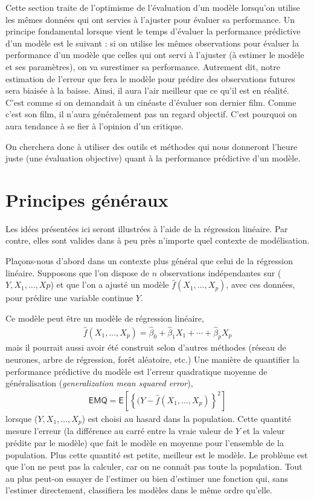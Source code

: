 \documentclass[
  11pt,
  letterpaper,
]{book}
\theoremstyle{definition}
\theoremstyle{definition}
\theoremstyle{definition}
\theoremstyle{remark}
\begin{document}
Cette section traite de l'optimisme de l'évaluation d'un modèle lorsqu'on utilise les mêmes données qui ont servies à l'ajuster pour évaluer sa performance. Un principe fondamental lorsque vient le temps d'évaluer la performance prédictive d'un modèle est le suivant : si on utilise les mêmes observations pour évaluer la performance d'un modèle que celles qui ont servi à l'ajuster (à estimer le modèle et ses paramètres), on va surestimer sa performance. Autrement dit, notre estimation de l'erreur que fera le modèle pour prédire des observations futures sera biaisée à la baisse. Ainsi, il aura l'air meilleur que ce qu'il est en réalité. C'est comme si on demandait à un cinéaste d'évaluer son dernier film. Comme c'est son film, il n'aura généralement pas un regard objectif. C'est pourquoi on aura tendance à se fier à l'opinion d'un critique.

On cherchera donc à utiliser des outils et méthodes qui nous donneront l'heure juste (une évaluation objective) quant à la performance prédictive d'un modèle.

\hypertarget{principes-guxe9nuxe9raux}{%
\section{Principes généraux}\label{principes-guxe9nuxe9raux}}

Les idées présentées ici seront illustrées à l'aide de la régression linéaire. Par contre, elles sont valides dans à peu près n'importe quel contexte de modélisation.

Plaçons-nous d'abord dans un contexte plus général que celui de la régression linéaire. Supposons que l'on dispose de \(n\) observations indépendantes sur (\(Y, X_1, \ldots, Xp\)) et que l'on a ajusté un modèle \(\widehat{f}(X_1, \ldots, X_p)\), avec ces données, pour prédire une variable continue \(Y\).

Ce modèle peut être un modèle de régression linéaire,
\begin{align*}
\widehat{f}(X_1, \ldots, X_p) = \widehat{\beta}_0 + \widehat{\beta}_1X_1 + \cdots + \widehat{\beta}_pX_p
\end{align*}
mais il pourrait aussi avoir été construit selon d'autres méthodes (réseau de neurones, arbre de régression, forêt aléatoire, etc.) Une manière de quantifier la performance prédictive du modèle est l'erreur quadratique moyenne de généralisation (\emph{generalization mean squared error}),
\begin{align*}
\mathsf{EMQ}=\mathsf{E}\left[\left\{(Y-\widehat{f}(X_1, \ldots, X_p)\right\}^2\right]
\end{align*}
lorsque (\(Y, X_1, \ldots, X_p\)) est choisi au hasard dans la population. Cette quantité mesure l'erreur (la différence au carré entre la vraie valeur de \(Y\) et la valeur prédite par le modèle) que fait le modèle en moyenne pour l'ensemble de la population. Plus cette quantité est petite, meilleur est le modèle. Le problème est que l'on ne peut pas la calculer, car on ne connaît pas toute la population. Tout au plus peut-on essayer de l'estimer ou bien d'estimer une fonction qui, sans l'estimer directement, classifiera les modèles dans le même ordre qu'elle.
\end{document}
